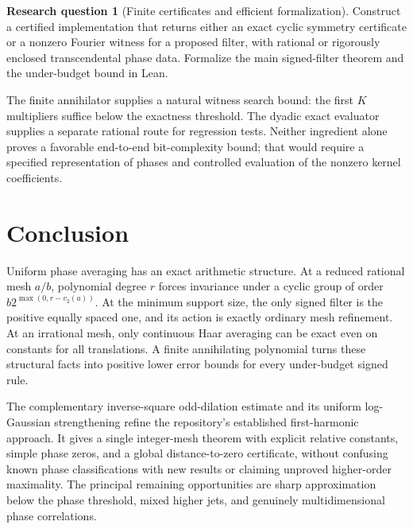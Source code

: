 \documentclass[11pt,a4paper]{article}
\numberwithin{equation}{section}
\theoremstyle{definition}
\newtheorem{question}{Research question}
\theoremstyle{remark}
\begin{document}
\begin{question}[Finite certificates and efficient formalization]
Construct a certified implementation that returns either an exact cyclic
symmetry certificate or a nonzero Fourier witness for a proposed filter,
with rational or rigorously enclosed transcendental phase data. Formalize
the main signed-filter theorem and the under-budget bound in Lean.
\end{question}
The finite annihilator supplies a natural witness search bound: the first
$K$ multipliers suffice below the exactness threshold. The dyadic exact
evaluator supplies a separate rational route for regression tests.
Neither ingredient alone proves a favorable end-to-end bit-complexity
bound; that would require a specified representation of phases and
controlled evaluation of the nonzero kernel coefficients.

\section{Conclusion}

Uniform phase averaging has an exact arithmetic structure. At a reduced
rational mesh $a/b$, polynomial degree $r$ forces invariance under a
cyclic group of order $b2^{\max(0,r-v_2(a))}$. At the minimum support
size, the only signed filter is the positive equally spaced one, and
its action is exactly ordinary mesh refinement. At an irrational mesh,
only continuous Haar averaging can be exact even on constants for all
translations. A finite annihilating polynomial turns these structural
facts into positive lower error bounds for every under-budget signed
rule.

The complementary inverse-square odd-dilation estimate and its uniform
log-Gaussian strengthening refine the repository's established
first-harmonic approach. It gives a single
integer-mesh theorem with explicit relative constants, simple phase
zeros, and a global distance-to-zero certificate, without confusing
known phase classifications with new results or claiming unproved
higher-order maximality. The principal remaining opportunities are
sharp approximation below the phase threshold, mixed higher jets,
and genuinely multidimensional phase correlations.
\end{document}
